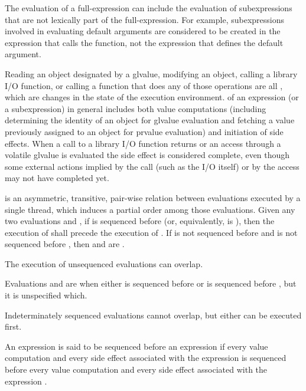 \pnum
\begin{note}
The evaluation of a full-expression can include the
evaluation of subexpressions that are not lexically part of the
full-expression. For example, subexpressions involved in evaluating
default arguments are considered to
be created in the expression that calls the function, not the expression
that defines the default argument.
\end{note}

\pnum
{}%
Reading an object designated by a 
glvalue, modifying an object, calling a library I/O
function, or calling a function that does any of those operations are
all
, which are changes in the state of the execution
environment.  of an expression (or a
subexpression) in general includes both value computations (including
determining the identity of an object for glvalue evaluation and fetching
a value previously assigned to an object for prvalue evaluation) and
initiation of side effects. When a call to a library I/O function
returns or an access through a volatile glvalue is evaluated the side
effect is considered complete, even though some external actions implied
by the call (such as the I/O itself) or by the  access
may not have completed yet.

\pnum
{} is an asymmetric, transitive, pair-wise relation between
evaluations executed by a single thread, which induces
a partial order among those evaluations. Given any two evaluations  and
, if  is sequenced before 
(or, equivalently,  is  ),
then the execution of
 shall precede the execution of . If  is not sequenced
before  and  is not sequenced before , then  and
 are .
\begin{note}
The execution of unsequenced
evaluations can overlap.
\end{note}
Evaluations  and  are
 when either  is sequenced before
 or  is sequenced before , but it is unspecified which.
\begin{note}
Indeterminately sequenced evaluations cannot overlap, but either
can be executed first.
\end{note}
An expression 
is said to be sequenced before
an expression  if
every value computation and every side effect
associated with the expression 
is sequenced before
every value computation and every side effect
associated with the expression .

